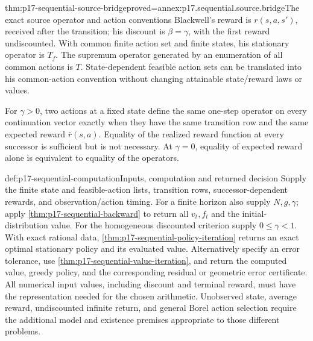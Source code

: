 \begin{hblemma}{thm:p17-sequential-source-bridge}{proved=annex:p17.sequential.source.bridge}{The exact source operator and action conventions}
Blackwell's reward is \(r(s,a,s')\), received after the
transition; his discount is \(\beta=\gamma\), with the
first reward undiscounted. With common finite action set
and finite states, his stationary operator is \(T_f\).
The supremum operator generated by an enumeration of all
common actions is \(T\).
State-dependent feasible action sets can be translated into
his common-action convention without changing attainable
state/reward laws or values.

For \(\gamma>0\), two actions at a fixed state define the
same one-step operator on every continuation vector exactly
when they have the same transition row and the same
expected reward \(\bar r(s,a)\). Equality of the realized
reward function at every successor is sufficient but is not
necessary. At \(\gamma=0\), equality of expected reward
alone is equivalent to equality of the operators.
\end{hblemma}

\begin{hbmethod}{def:p17-sequential-computation}{Inputs, computation and returned decision}
Supply the finite state and feasible-action lists, transition rows,
successor-dependent rewards, and observation/action timing.
For a finite horizon also supply \(N,g,\gamma\); apply
\cref{thm:p17-sequential-backward} to return all \(v_t,f_t\)
and the initial-distribution value.
For the homogeneous discounted criterion supply \(0\leq\gamma<1\).
With exact rational data, \cref{thm:p17-sequential-policy-iteration}
returns an exact optimal stationary policy and its evaluated value.
Alternatively specify an error tolerance, use
\cref{thm:p17-sequential-value-iteration}, and return the
computed value, greedy policy, and the corresponding residual
or geometric error certificate.
All numerical input values, including discount and terminal reward,
must have the representation needed for the chosen arithmetic.
Unobserved state, average reward, undiscounted infinite return,
and general Borel action selection require the additional model
and existence premises appropriate to those different problems.
\end{hbmethod}
